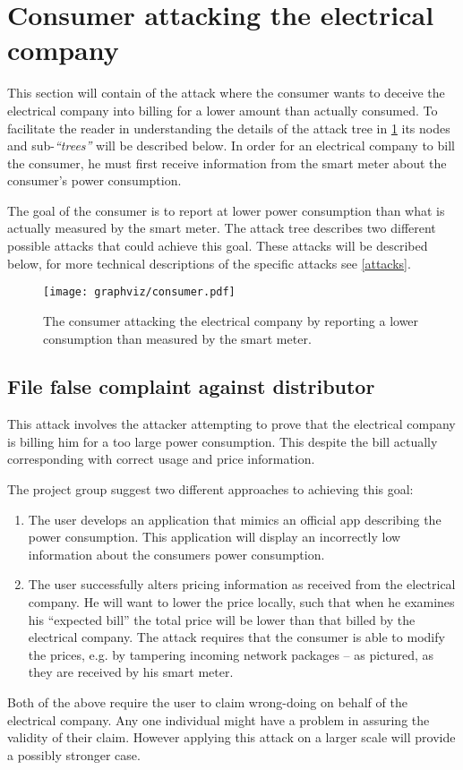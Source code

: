 
\section{Consumer attacking the electrical company}
This section will contain of the attack where the consumer wants to deceive the electrical company into billing for a lower amount than actually consumed.
To facilitate the reader in understanding the details of the attack tree in \cref{report_power_attack_tree} its nodes and sub-\emph{``trees''} will be described below.
In order for an electrical company to bill the consumer, he must first receive information from the smart meter about the consumer's power consumption.

The goal of the consumer is to report at lower power consumption than what is actually measured by the smart meter.
The attack tree describes two different possible attacks that could achieve this goal.
These attacks will be described below, for more technical descriptions of the specific attacks see \cref{attacks}.

\begin{figure}[H]
  \texttt{[image: graphviz/consumer.pdf]}
  \caption{The consumer attacking the electrical company by reporting a lower consumption than measured by the smart meter.}
  \label{report_power_attack_tree}
\end{figure}

\subsection{File false complaint against distributor}
This attack involves the attacker attempting to prove that the electrical company is billing him for a too large power consumption.
This despite the bill actually corresponding with correct usage and price information.

The project group suggest two different approaches to achieving this goal:
\begin{enumerate}
  \item The user develops an application that mimics an official app describing the power consumption.
  This application will display an incorrectly low information about the consumers power consumption.
  \item The user successfully alters pricing information as received from the electrical company.
  He will want to lower the price locally, such that when he examines his ``expected bill'' the total price will be lower than that billed by the electrical company.
  The attack requires that the consumer is able to modify the prices, e.g. by tampering incoming network packages -- as pictured, as they are received by his smart meter.
\end{enumerate}
Both of the above require the user to claim wrong-doing on behalf of the electrical company.
Any one individual might have a problem in assuring the validity of their claim.
However applying this attack on a larger scale will provide a possibly stronger case.


